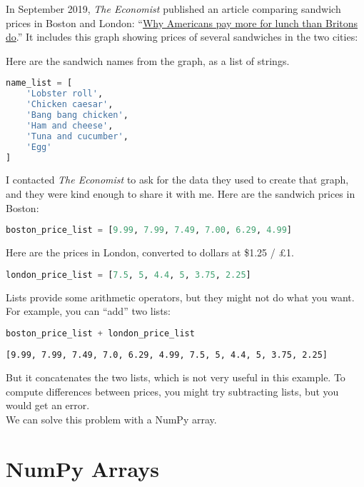 In September 2019, \emph{The Economist} published an article comparing
sandwich prices in Boston and London:
``\href{https://www.economist.com/finance-and-economics/2019/09/07/why-americans-pay-more-for-lunch-than-britons-do}{Why
Americans pay more for lunch than Britons do}.'' It includes this graph
showing prices of several sandwiches in the two cities:

Here are the sandwich names from the graph, as a list of strings.

\begin{lstlisting}[language=Python]
name_list = [
    'Lobster roll',
    'Chicken caesar',
    'Bang bang chicken',
    'Ham and cheese',
    'Tuna and cucumber',
    'Egg'
]
\end{lstlisting}

I contacted \emph{The Economist} to ask for the data they used to create
that graph, and they were kind enough to share it with me. Here are the
sandwich prices in Boston:

\begin{lstlisting}[language=Python]
boston_price_list = [9.99, 7.99, 7.49, 7.00, 6.29, 4.99]
\end{lstlisting}

Here are the prices in London, converted to dollars at \$1.25 / £1.

\begin{lstlisting}[language=Python]
london_price_list = [7.5, 5, 4.4, 5, 3.75, 2.25]
\end{lstlisting}

Lists provide some arithmetic operators, but they might not do what you
want. For example, you can ``add'' two lists:

\begin{lstlisting}[language=Python]
boston_price_list + london_price_list
\end{lstlisting}

\begin{lstlisting}[]
[9.99, 7.99, 7.49, 7.0, 6.29, 4.99, 7.5, 5, 4.4, 5, 3.75, 2.25]
\end{lstlisting}

But it concatenates the two lists, which is not very useful in this
example. To compute differences between prices, you might try
subtracting lists, but you would get an error.\\
We can solve this problem with a NumPy array.

\hypertarget{numpy-arrays}{%
\section{NumPy Arrays}\label{numpy-arrays}}

